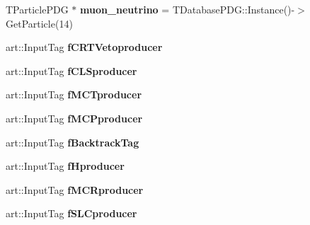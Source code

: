 \begin{DoxyCompactItemize}
\item 
T\+Particle\+P\+DG $\ast$ {\bfseries muon\+\_\+neutrino} = T\+Database\+P\+D\+G\+::\+Instance()-\/$>$Get\+Particle(14)\hypertarget{classanalysis_1_1DefaultAnalysis_a0e76c2baabff12b0a3f19aa54c54a59d}{}\label{classanalysis_1_1DefaultAnalysis_a0e76c2baabff12b0a3f19aa54c54a59d}

\item 
art\+::\+Input\+Tag {\bfseries f\+C\+R\+T\+Vetoproducer}\hypertarget{classanalysis_1_1DefaultAnalysis_aba3c76b59d2a5b2e24f50b2868c4c045}{}\label{classanalysis_1_1DefaultAnalysis_aba3c76b59d2a5b2e24f50b2868c4c045}

\item 
art\+::\+Input\+Tag {\bfseries f\+C\+L\+Sproducer}\hypertarget{classanalysis_1_1DefaultAnalysis_ae4cd0c3f1d34676303c2bf78512b1033}{}\label{classanalysis_1_1DefaultAnalysis_ae4cd0c3f1d34676303c2bf78512b1033}

\item 
art\+::\+Input\+Tag {\bfseries f\+M\+C\+Tproducer}\hypertarget{classanalysis_1_1DefaultAnalysis_a5a9b0c6d9996f8c7198158b3f36acd67}{}\label{classanalysis_1_1DefaultAnalysis_a5a9b0c6d9996f8c7198158b3f36acd67}

\item 
art\+::\+Input\+Tag {\bfseries f\+M\+C\+Pproducer}\hypertarget{classanalysis_1_1DefaultAnalysis_ad10d6b02fc6fcd46a25c30877f1fb634}{}\label{classanalysis_1_1DefaultAnalysis_ad10d6b02fc6fcd46a25c30877f1fb634}

\item 
art\+::\+Input\+Tag {\bfseries f\+Backtrack\+Tag}\hypertarget{classanalysis_1_1DefaultAnalysis_a8dab9b6e3afeeb11bf7baf043daa5ecd}{}\label{classanalysis_1_1DefaultAnalysis_a8dab9b6e3afeeb11bf7baf043daa5ecd}

\item 
art\+::\+Input\+Tag {\bfseries f\+Hproducer}\hypertarget{classanalysis_1_1DefaultAnalysis_a4fbfc54f63dec8d38301ad853ed9f719}{}\label{classanalysis_1_1DefaultAnalysis_a4fbfc54f63dec8d38301ad853ed9f719}

\item 
art\+::\+Input\+Tag {\bfseries f\+M\+C\+Rproducer}\hypertarget{classanalysis_1_1DefaultAnalysis_abf7821b91f9c87b40cbefa49824bebe7}{}\label{classanalysis_1_1DefaultAnalysis_abf7821b91f9c87b40cbefa49824bebe7}

\item 
art\+::\+Input\+Tag {\bfseries f\+S\+L\+Cproducer}\hypertarget{classanalysis_1_1DefaultAnalysis_ac3aef1da86526ce278fc67a56a73d759}{}\label{classanalysis_1_1DefaultAnalysis_ac3aef1da86526ce278fc67a56a73d759}


\end{DoxyCompactItemize}
